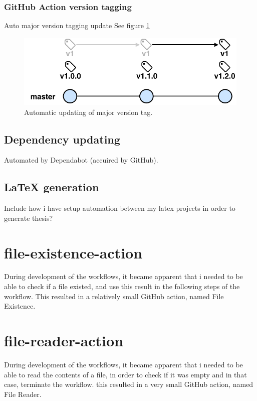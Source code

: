 \subsubsection{GitHub Action version tagging}
Auto major version tagging update
See figure \ref{fig:update-major-tag}

\begin{figure}[h]
    \setlength{\abovecaptionskip}{25pt}
    \centering
    \hspace*{-2cm}\includegraphics[page=1,scale=1]{sections/methodology/figures/update-major-tag.pdf}
    \caption{Automatic updating of major version tag.}
    \label{fig:update-major-tag}
\end{figure}

\subsection{Dependency updating}
Automated by Dependabot (accuired by GitHub).

\subsection{LaTeX generation}
Include how i have setup automation between my latex projects in order to generate thesis?

\section{file-existence-action}
During development of the workflows, it became apparent that i needed to be able to check if a file existed, and use this result in the following steps of the workflow.  This resulted in a relatively small GitHub action, named File Existence.

\section{file-reader-action}
During development of the workflows, it became apparent that i needed to be able to read the contents of a file, in order to check if it was empty and in that case, terminate the workflow. this resulted in a very small GitHub action, named File Reader.